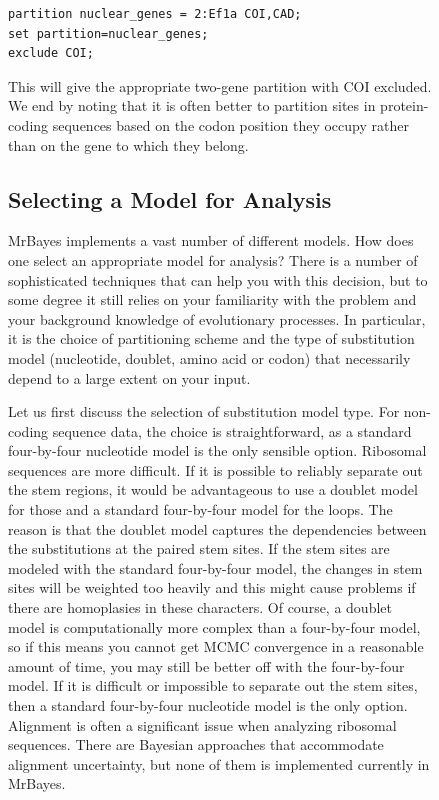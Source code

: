 \documentclass[12pt]{book}
\begin{document}
\begin{figure}[h]
\footnotesize
\begin{singlespacing}
\begin{verbatim}
partition nuclear_genes = 2:Ef1a COI,CAD;
set partition=nuclear_genes;
exclude COI;
\end{verbatim}
\end{singlespacing}
\normalsize

This will give the appropriate two-gene partition with COI excluded. We end by noting that it is
often better to partition sites in protein-coding sequences based on the codon position they occupy
rather than on the gene to which they belong.

\subsection{Selecting a Model for Analysis}

MrBayes implements a vast number of different models. How does one select an appropriate model for
analysis? There is a number of sophisticated techniques that can help you with this decision, but
to some degree it still relies on your familiarity with the problem and your background knowledge
of evolutionary processes. In particular, it is the choice of partitioning scheme and the type of
substitution model (nucleotide, doublet, amino acid or codon) that necessarily depend to a large
extent on your input.

Let us first discuss the selection of substitution model type. For non-coding sequence data, the
choice is straightforward, as a standard four-by-four nucleotide model is the only sensible option.
Ribosomal sequences are more difficult. If it is possible to reliably separate out the stem
regions, it would be advantageous to use a doublet model for those and a standard four-by-four
model for the loops. The reason is that the doublet model captures the dependencies between the
substitutions at the paired stem sites. If the stem sites are modeled with the standard
four-by-four model, the changes in stem sites will be weighted too heavily and this might cause
problems if there are homoplasies in these characters. Of course, a doublet model is
computationally more complex than a four-by-four model, so if this means you cannot get MCMC
convergence in a reasonable amount of time, you may still be better off with the four-by-four
model. If it is difficult or impossible to separate out the stem sites, then a standard
four-by-four nucleotide model is the only option. Alignment is often a significant issue when
analyzing ribosomal sequences. There are Bayesian approaches that accommodate alignment
uncertainty, but none of them is implemented currently in MrBayes.


\end{figure}
\end{document}

